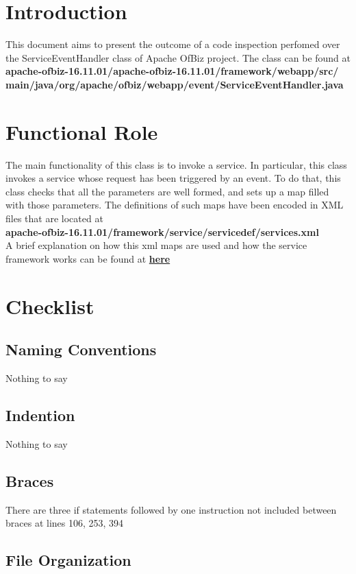 \documentclass{article}
\begin{document}
\section{Introduction}
This document aims to present the outcome of a code inspection perfomed over the ServiceEventHandler class of Apache OfBiz project. The class can be found at\\
\textbf{apache-ofbiz-16.11.01/apache-ofbiz-16.11.01/framework/webapp/src/}\\
\textbf{main/java/org/apache/ofbiz/webapp/event/ServiceEventHandler.java}\\

\section{Functional Role}
The main functionality of this class is to invoke a service. In particular, this class invokes a service whose request has been triggered by an event. To do that, this class checks that all the parameters are well formed, and sets up a map filled with those parameters. The definitions of such maps have been encoded in XML files that are located at\\
\textbf{apache-ofbiz-16.11.01/framework/service/servicedef/services.xml}\\

A brief explanation on how this xml maps are used and how the service framework works can be found at \href{https://cwiki.apache.org/confluence/display/OFBIZ/Service+Engine+Guide#ServiceEngineGuide-serviceDefinition}{\textbf{here}}

\section{Checklist}
\subsection{Naming Conventions}
Nothing to say
\subsection{Indention}
Nothing to say
\subsection{Braces}
There are three if statements followed by one instruction not included between braces at lines 106, 253, 394
\subsection{File Organization}
\end{document}
